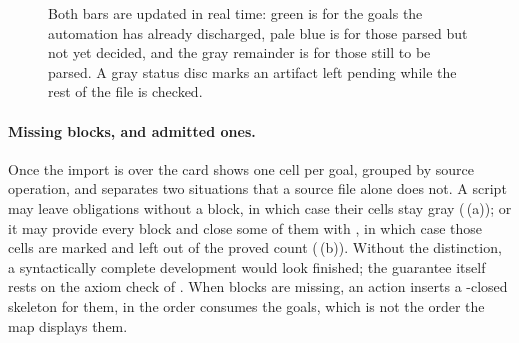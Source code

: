 \begin{figure}[t]
{%
  }
  \caption{Both bars are updated in
    real time: green is for the goals the automation has already discharged, pale blue is for those
    parsed but not yet decided, and the gray remainder is for those still to be parsed. A gray
    status disc marks an artifact left pending while the rest of the file is checked.}
  \label{fig:barrel-state-loading}
\end{figure}

\paragraph*{Missing blocks, and admitted ones.}
Once the import is over the card shows one cell per goal, grouped by source operation, and
separates two situations that a source file alone does not.
A script may leave obligations without a  block, in which case their cells stay
gray (\,(a)); or it may provide every block and close some of
them with , in which case those cells are marked and left out of the proved
count (\,(b)).
Without the distinction, a syntactically complete development would look finished; the
guarantee itself rests on the axiom check of .
When blocks are missing, an action inserts a -closed skeleton for them, in the
order  consumes the goals, which is not the order the map
displays them.

